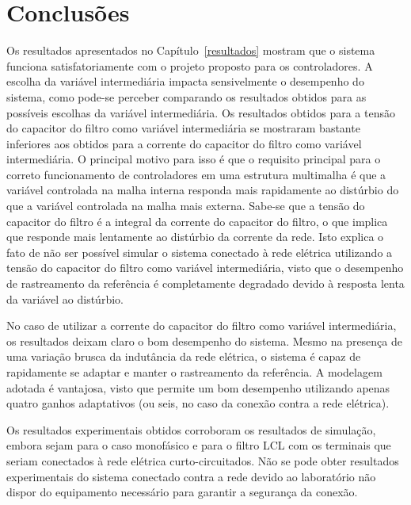 
\chapter{Conclusões}\label{conclusoes}

  Os resultados apresentados no Capítulo~\ref{resultados} mostram que o sistema funciona satisfatoriamente com o projeto proposto para os controladores. A escolha da variável intermediária impacta sensivelmente o desempenho do sistema, como pode-se perceber comparando os resultados obtidos para as possíveis escolhas da variável intermediária. Os resultados obtidos para a tensão do capacitor do filtro como variável intermediária se mostraram bastante inferiores aos obtidos para a corrente do capacitor do filtro como variável intermediária. O principal motivo para isso é que o requisito principal para o correto funcionamento de controladores em uma estrutura multimalha é que a variável controlada na malha interna responda mais rapidamente ao distúrbio do que a variável controlada na malha mais externa. Sabe-se que a tensão do capacitor do filtro é a integral da corrente do capacitor do filtro, o que implica que responde mais lentamente ao distúrbio da corrente da rede. Isto explica o fato de não ser possível simular o sistema conectado à rede elétrica utilizando a tensão do capacitor do filtro como variável intermediária, visto que o desempenho de rastreamento da referência é completamente degradado devido à resposta lenta da variável ao distúrbio.

  No caso de utilizar a corrente do capacitor do filtro como variável intermediária, os resultados deixam claro o bom desempenho do sistema. Mesmo na presença de uma variação brusca da indutância da rede elétrica, o sistema é capaz de rapidamente se adaptar e manter o rastreamento da referência. A modelagem adotada é vantajosa, visto que permite um bom desempenho utilizando apenas quatro ganhos adaptativos (ou seis, no caso da conexão contra a rede elétrica).

  Os resultados experimentais obtidos corroboram os resultados de simulação, embora sejam para o caso monofásico e para o filtro LCL com os terminais que seriam conectados à rede elétrica curto-circuitados. Não se pode obter resultados experimentais do sistema conectado contra a rede devido ao laboratório não dispor do equipamento necessário para garantir a segurança da conexão.

